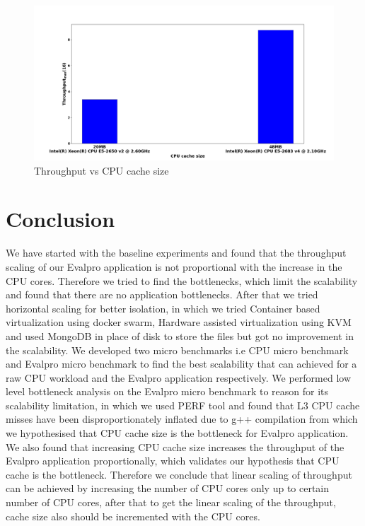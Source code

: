 \documentclass[sigconf]{acmart}
\begin{document}
\begin{figure}[!htb]
  \centering
  \includegraphics[width=\linewidth]{Pictures/cpu_cache_throughput.png}
  \caption{Throughput vs CPU cache size }
  \label{throughput_cache_graph}
\end{figure}


\section{Conclusion}\label{conclusion}
We have started with the baseline experiments and found that the throughput scaling of our Evalpro application is not proportional with the increase in the CPU cores. Therefore we tried to find the bottlenecks, which limit the scalability and found that there are no application bottlenecks. After that we tried horizontal scaling for better isolation, in which we tried Container based virtualization using docker swarm, Hardware assisted virtualization using KVM and used MongoDB in place of disk to store the files but got no improvement in the scalability. We developed two micro benchmarks i.e CPU micro benchmark and Evalpro micro benchmark to find the best scalability that can achieved for a raw CPU workload and the Evalpro application respectively. We performed low level bottleneck analysis on the Evalpro micro benchmark to  reason for its scalability limitation, in which we used PERF tool and found that L3 CPU cache misses have been disproportionately inflated due to g++ compilation from which we hypothesised that  CPU cache size is the bottleneck for Evalpro application. We also found that increasing  CPU cache size increases the throughput of the Evalpro application proportionally, which validates our hypothesis that CPU cache is the bottleneck. Therefore we conclude that linear scaling of throughput can be achieved by increasing the number of CPU cores only up to certain number of CPU cores, after that to get the linear scaling of the throughput, cache size also should be incremented with the CPU cores.
\end{document}
